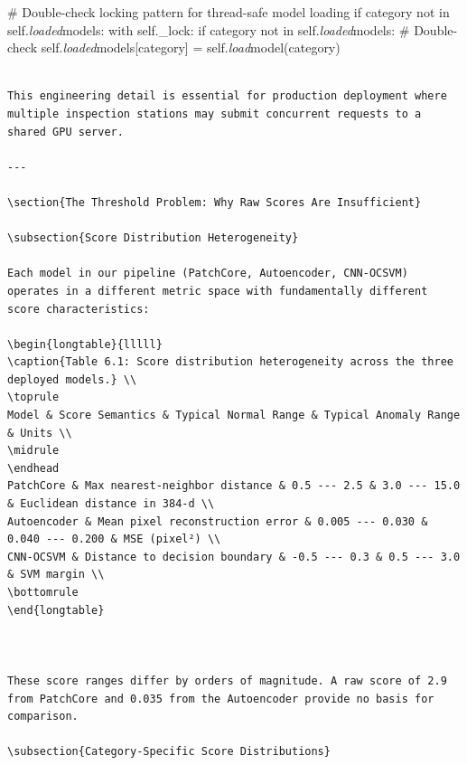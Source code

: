 \documentclass[12pt,a4paper,oneside]{report}
\begin{document}
# Double-check locking pattern for thread-safe model loading
if category not in self.\textit{loaded}models:
    with self._lock:
        if category not in self.\textit{loaded}models:  # Double-check
            self.\textit{loaded}models[category] = self.\textit{load}model(category)
\begin{verbatim}

This engineering detail is essential for production deployment where multiple inspection stations may submit concurrent requests to a shared GPU server.

---

\section{The Threshold Problem: Why Raw Scores Are Insufficient}

\subsection{Score Distribution Heterogeneity}

Each model in our pipeline (PatchCore, Autoencoder, CNN-OCSVM) operates in a different metric space with fundamentally different score characteristics:

\begin{longtable}{lllll}
\caption{Table 6.1: Score distribution heterogeneity across the three deployed models.} \\
\toprule
Model & Score Semantics & Typical Normal Range & Typical Anomaly Range & Units \\
\midrule
\endhead
PatchCore & Max nearest-neighbor distance & 0.5 --- 2.5 & 3.0 --- 15.0 & Euclidean distance in 384-d \\
Autoencoder & Mean pixel reconstruction error & 0.005 --- 0.030 & 0.040 --- 0.200 & MSE (pixel²) \\
CNN-OCSVM & Distance to decision boundary & -0.5 --- 0.3 & 0.5 --- 3.0 & SVM margin \\
\bottomrule
\end{longtable}



These score ranges differ by orders of magnitude. A raw score of 2.9 from PatchCore and 0.035 from the Autoencoder provide no basis for comparison.

\subsection{Category-Specific Score Distributions}


\end{verbatim}
\end{document}

